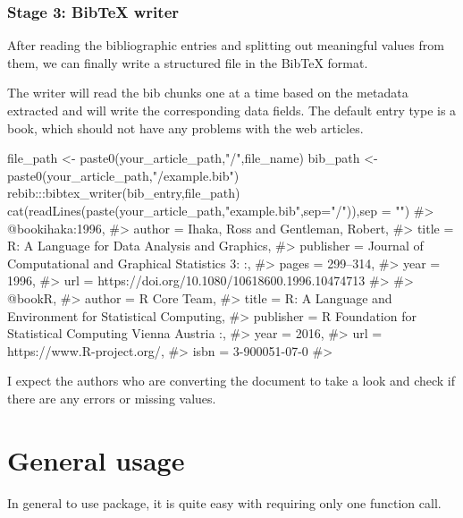 \subsubsection{Stage 3: BibTeX writer}

After reading the bibliographic entries and splitting out meaningful values from them, we can finally write a structured file in the BibTeX format.

The writer will read the bib chunks one at a time based on the metadata extracted and will write the corresponding data fields. The default entry type is a book, which should not have any problems with the web articles. 
\begin{Schunk}

\begin{Sinput}
file_path <- paste0(your_article_path,"/",file_name)
bib_path <- paste0(your_article_path,"/example.bib")
rebib:::bibtex_writer(bib_entry,file_path)
cat(readLines(paste(your_article_path,"example.bib",sep="/")),sep = "\n")
#> @book{ihaka:1996,
#> author = {{Ihaka, Ross and Gentleman, Robert}},
#> title = {{R: A Language for Data Analysis and Graphics}},
#> publisher = {Journal of Computational and Graphical Statistics 3:   :},
#> pages = {299--314},
#> year = {1996},
#> url = {https://doi.org/10.1080/10618600.1996.10474713}
#> }
#> @book{R,
#> author = {R {Core Team}},
#> title = {{R: A Language and Environment for Statistical Computing}},
#> publisher = {R Foundation for Statistical Computing Vienna Austria    :},
#> year = {2016},
#> url = {https://www.R-project.org/},
#> isbn = {3-900051-07-0}
#> }
\end{Sinput}
\end{Schunk}

I expect the authors who are converting the document to take a look and check if there are any errors or missing values. 



\section{General usage}
In general to use  package, it is quite easy with requiring only one function call.
